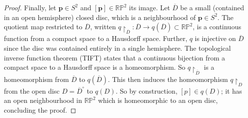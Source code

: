 \documentclass[a4paper,11pt]{article}
\begin{document}
\begin{example}
\begin{proof}
		Finally, let \( \mathbf p \in S^2 \) and \( [\mathbf p] \in \mathbb R \mathbb P^2 \) its image.
		Let \( \overline D \) be a small (contained in an open hemisphere) closed disc, which is a neighbourhood of \( \mathbf p \in S^2 \).
		The quotient map restricted to \( \overline D \), written \( q\restriction_{\overline D} \colon \overline D \to q(\overline D) \subset \mathbb R \mathbb P^2 \), is a continuous function from a compact space to a Hausdorff space.
		Further, \( q \) is injective on \( \overline D \) since the disc was contained entirely in a single hemisphere.
		The topological inverse function theorem (TIFT) states that a continuous bijection from a compact space to a Hausdorff space is a homeomorphism.
		So \( q\restriction_{\overline D} \) is a homeomorphism from \( \overline D \) to \( q(\overline D) \).
		This then induces the homeomorphism \( q\restriction_{D} \) from the open disc \( D = {\overline D}^\circ \) to \( q(D) \).
		So by construction, \( [p] \in q(D) \); it has an open neighbourhood in \( \mathbb R \mathbb P^2 \) which is homeomorphic to an open disc, concluding the proof.
	\end{proof}
\end{example}
\end{document}
